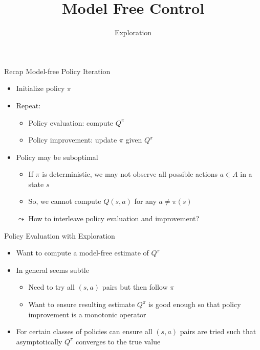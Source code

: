\documentclass[aspectratio=169]{../latex_main/tntbeamer}  %
\title[RL: Model Free Control]{Model Free Control}
\subtitle{Exploration}
\begin{document}
	
	\maketitle

\begin{frame}[c]{Recap Model-free Policy Iteration}
	
	\begin{itemize}
		\item Initialize policy $\pi$
		\item Repeat:
		\begin{itemize}
			\item Policy evaluation: compute $Q^\pi$
			\item Policy improvement: update $\pi$ given $Q^\pi$
		\end{itemize}
		\bigskip
		\pause
		\item Policy may be suboptimal
		\begin{itemize}
			\item If $\pi$ is deterministic, we may not observe all possible actions $a\in A$ in a state $s$
			\item So, we cannot compute $Q(s,a)$ for any $a \neq \pi(s)$
		\end{itemize}
		\pause
		\item[$\leadsto$] How to interleave policy evaluation and improvement?
	\end{itemize}

\end{frame}
\begin{frame}[c]{Policy Evaluation with Exploration}
	
	\begin{itemize}
		\item Want to compute a model-free estimate of $Q^\pi$
		\item In general seems subtle
		\begin{itemize}
			\item Need to try all $(s,a)$ pairs but then follow $\pi$
			\item Want to ensure resulting estimate $Q^\pi$ is good enough so that policy
			improvement is a monotonic operator
		\end{itemize}
		\item For certain classes of policies can ensure all $(s,a)$ pairs are tried such
		that asymptotically $Q^\pi$ converges to the true value
	\end{itemize}
	
\end{frame}
\end{document}
